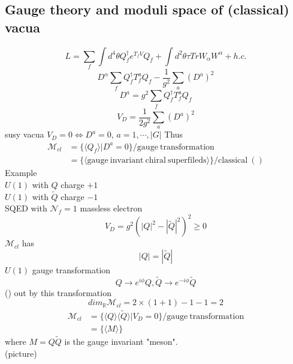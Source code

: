 \documentclass[type = bachelor]{fduthesis-en}
\begin{document}
\subsection{Gauge theory and moduli space of (classical) vacua}
\begin{equation}
L=\sum_f\int d^4\theta Q_f^\dagger e^{T_fV}Q_f+\int d^2\theta\tau TrW_\alpha W^\alpha+h.c.
\end{equation}
\begin{equation}
D^\alpha\sum_fQ_f^\dagger T_f^aQ_f-\frac{1}{g^2}\sum_a(D^a)^2
\end{equation}
\begin{equation}
D^a=g^2\sum_fQ_f^\dagger T_f^aQ_f
\end{equation}
\begin{equation}
V_D=\frac{1}{2g^2}\sum_a(D^a)^2
\end{equation}
susy vacua $V_D=0\Leftrightarrow D^a=0$, $a=1,\cdots,\left|G\right|$
Thus
\begin{align}
\mathcal{M}_{cl}&=\{\langle Q_f\rangle|D^a=0\}/\mathrm{gauge\ transformation}\\
&=\{\langle\mathrm{gauge\ invariant\ chiral\ superfileds}\rangle\}/\mathrm{classical\ ()}
\end{align}
Example\\
$U(1)$ with $Q$ charge $+1$\\
$U(1)$ with $\widetilde{Q}$ charge $-1$\\
SQED with $\mathcal{N}_f=1$ massless electron\\
\begin{equation}
V_D=g^2(\left|Q\right|^2-\left|\widetilde{Q}\right|^2)^2\geq0
\end{equation}
$\mathcal{M}_{cl}$ has
\[
\left|Q\right|=\left|\widetilde{Q}\right|
\]
$U(1)$ gauge transformation
\begin{equation}
Q\rightarrow e^{i\phi}Q, \widetilde{Q}\rightarrow e^{-i\phi}\widetilde{Q}
\end{equation}
() out by this transformation
\begin{equation}
dim_{\mathbb{R}}\mathcal{M}_{cl}=2\times(1+1)-1-1=2
\end{equation}
\begin{align}
\mathcal{M}_{cl}&=\{\langle Q\rangle\langle\widetilde{Q}\rangle|V_D=0\}/\mathrm{gauge\ transformation}\\
&=\{\langle M\rangle\}
\end{align}
where $M=Q\widetilde{Q}$ is the gauge invariant "meson".\\
(picture)\\
\end{document}
